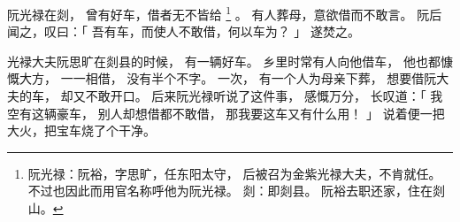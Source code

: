 
\switchcolumn*[\section{}]

阮光禄在剡，
曾有好车，借者无不皆给%
\footnote{%
    阮光禄：阮裕，字思旷，任东阳太守，
            后被召为金紫光禄大夫，不肯就任。
            不过也因此而用官名称呼他为阮光禄。
    剡：即剡县。
        阮裕去职还家，住在剡山。
}%
。
有人葬母，意欲借而不敢言。
阮后闻之，叹曰：「
    吾有车，而使人不敢借，何以车为？
」
遂焚之。

\switchcolumn

光䘵大夫阮思旷在剡县的时候，
有一辆好车。
乡里时常有人向他借车，
他也都慷慨大方，
一一相借，
没有半个不字。
一次，
有一个人为母亲下葬，
想要借阮大夫的车，
却又不敢开口。
后来阮光禄听说了这件事，
感慨万分，
长叹道：「
    我空有这辆豪车，
    别人却想借都不敢借，
    那我要这车又有什么用！
」
说着便一把大火，把宝车烧了个干净。

